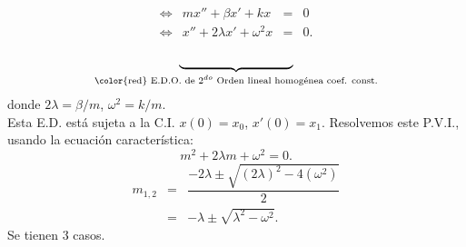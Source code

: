 \documentclass{beamer}
\begin{document}
\begin{frame}[t]
	\begin{block}{}
		\[
			\begin{array}{rrcl}
				\iff & mx'' + \beta x' + kx & = & 0 \\[2mm]
				\iff & x'' + 2 \lambda x' + \omega ^2x & = & 0.\\
			\end{array}
		\]
		\[
			\underbrace{\hphantom{x'' + 2 \lambda x' + \omega ^2x = 0}}_\text{\color{red} E.D.O. de \(2^{do}\) Orden lineal homogénea coef. const.} 
		\]
		donde \(2 \lambda = \beta /m\), \(\omega ^2 = k/m\). \\[2mm]
		Esta E.D. está sujeta a la C.I. \(x(0) = x_0\), \(x' (0) = x_1\).
		Resolvemos este P.V.I., usando la ecuación característica:
		\[
			m^2+2 \lambda m + \omega ^2 =0.
		\]
		\[
			\begin{array}{rcl}
				m_{1,2} & = & \dfrac{-2 \lambda \pm \sqrt{(2 \lambda) ^2 - 4(\omega ^2)}}{2}\\[2mm]
				& = & - \lambda \pm \sqrt{\lambda ^2- \omega ^2} .
			\end{array}
		\]
		Se tienen \(3\) casos.
	\end{block}
\end{frame}
\end{document}
